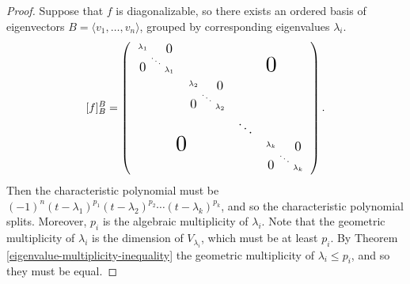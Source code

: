\begin{proof}
    Suppose that $f$ is diagonalizable, so there exists an ordered basis of eigenvectors $B = \langle v_1, \ldots, v_n \rangle$, grouped by corresponding eigenvalues $\lambda_i$.
    \[[f]_B^B = \left(\begin{array}{cccc}
        \raisebox{-10pt}[0pt][25pt]{$\begin{smallmatrix}
            \lambda_1 & & \smallblock{1.2}{-0.8}{0}\\
            & \ddots & \\
            \smallblock{1.2}{-0.3}{0} & & \lambda_1
        \end{smallmatrix}$} & & \largeblock{2}{-2}{0} \\
        & \raisebox{-10pt}[0pt][25pt]{$\begin{smallmatrix}
            \lambda_2 & & \smallblock{1.2}{-0.8}{0}\\
            & \ddots & \\
            \smallblock{1.2}{-0.3}{0} & & \lambda_2
        \end{smallmatrix}$} & & \\
        & & \scalebox{1.2}{$\ddots$} & \\
        \largeblock{2}{0}{0} & & \raisebox{-10pt}[0pt][25pt]{$\begin{smallmatrix}
            \lambda_k & & \smallblock{1.2}{-0.8}{0}\\
            & \ddots & \\
            \smallblock{1.2}{-0.3}{0} & & \lambda_k
        \end{smallmatrix}$}
    \end{array}\right).\]
    Then the characteristic polynomial must be $(-1)^n(t - \lambda_1)^{p_1}(t - \lambda_2)^{p_2}\cdots(t - \lambda_k)^{p_k}$, and so the characteristic polynomial splits. Moreover, $p_i$ is the algebraic multiplicity of $\lambda_i$. Note that the geometric multiplicity of $\lambda_i$ is the dimension of $V_{\lambda_i}$, which must be at least $p_i$. By Theorem \ref{eigenvalue-multiplicity-inequality} the geometric multiplicity of $\lambda_i \leq p_i$, and so they must be equal.


\end{proof}
